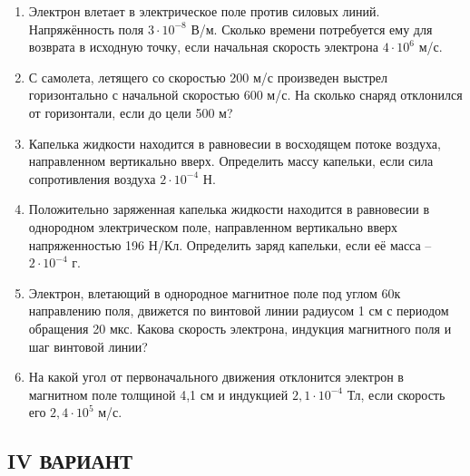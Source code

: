 \documentclass[a5paper, 10pt]{diss_4}
\renewcommand{\'}{\,'}
\begin{document}
\begin{enumerate}

\item Электрон влетает в электрическое поле против силовых линий. Напряжённость поля $3\cdot10^{-8}$ В/м. Сколько времени потребуется ему для возврата в исходную точку, если начальная скорость электрона $4\cdot10^6$ м/с.

\item С самолета, летящего со скоростью 200 м/с произведен выстрел горизонтально с начальной скоростью 600 м/с. На сколько снаряд отклонился от горизонтали, если до цели  500 м?

\item Капелька жидкости находится в равновесии в восходящем потоке воздуха, направленном  вертикально вверх. Определить массу капельки, если сила сопротивления воздуха $2\cdot10^{-4}$ Н.

\item Положительно заряженная капелька жидкости находится в равновесии в однородном электрическом поле, направленном  вертикально вверх напряженностью  196 Н/Кл. Определить заряд капельки, если её масса  -- $2\cdot10^{-4}$ г.

\item Электрон, влетающий в однородное магнитное поле под углом 60\textdegree к направлению поля, движется по винтовой линии радиусом 1 см с периодом обращения 20 мкс. Какова скорость электрона, индукция магнитного поля и шаг винтовой линии?

\item На какой угол от первоначального движения отклонится электрон в магнитном поле толщиной 4,1 см и индукцией $2,1\cdot10^{-4}$ Тл, если скорость его $2,4\cdot10^5$ м/с.

\end{enumerate}

\subsection{IV ВАРИАНТ}
\end{document}
